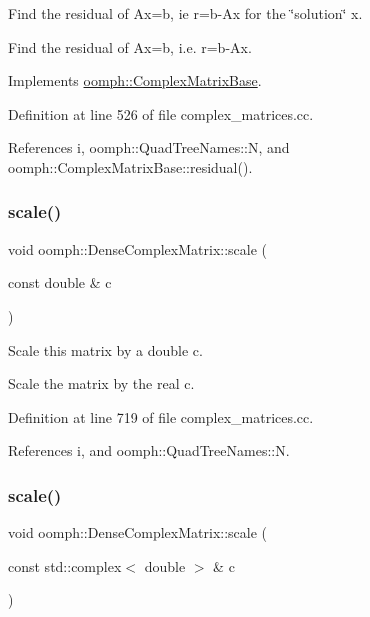 Find the residual of Ax=b, ie r=b-\/\+Ax for the \char`\"{}solution\char`\"{} x. 

Find the residual of Ax=b, i.\+e. r=b-\/\+Ax. 

Implements \hyperlink{classoomph_1_1ComplexMatrixBase_aec72875402b9ba387e0724d6c2597430}{oomph\+::\+Complex\+Matrix\+Base}.



Definition at line 526 of file complex\+\_\+matrices.\+cc.



References i, oomph\+::\+Quad\+Tree\+Names\+::N, and oomph\+::\+Complex\+Matrix\+Base\+::residual().

\mbox{\label{classoomph_1_1DenseComplexMatrix_a2a4bb5a94aa40df66d3da02d63f71712}} 
\subsubsection{\texorpdfstring{scale()}{scale()}\hspace{0.1cm}{\footnotesize\ttfamily [1/2]}}
{\footnotesize\ttfamily void oomph\+::\+Dense\+Complex\+Matrix\+::scale (\begin{DoxyParamCaption}\item[{const double \&}]{c }\end{DoxyParamCaption})}



Scale this matrix by a double c. 

Scale the matrix by the real c. 

Definition at line 719 of file complex\+\_\+matrices.\+cc.



References i, and oomph\+::\+Quad\+Tree\+Names\+::N.

\mbox{\label{classoomph_1_1DenseComplexMatrix_a49832bed306c52f822275b4c36cbe1d2}} 
\subsubsection{\texorpdfstring{scale()}{scale()}\hspace{0.1cm}{\footnotesize\ttfamily [2/2]}}
{\footnotesize\ttfamily void oomph\+::\+Dense\+Complex\+Matrix\+::scale (\begin{DoxyParamCaption}\item[{const std\+::complex$<$ double $>$ \&}]{c }\end{DoxyParamCaption})}



